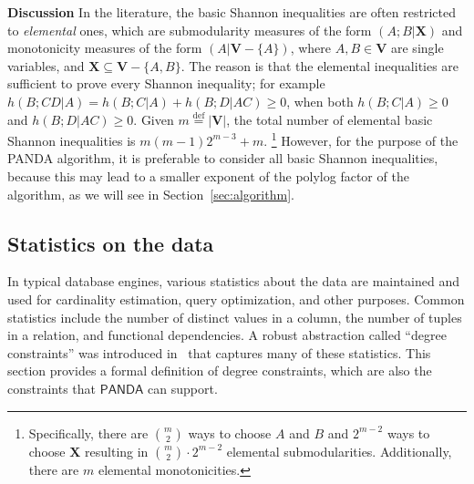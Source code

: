 \documentclass{theoretics}
\newcommand{\set}[1]{\{#1\}}                    %
\newcommand{\defeq}{\stackrel{\text{def}}{=}}
\newcommand{\panda}{\textsf{PANDA}\xspace}
\begin{document}
{\bf Discussion} In the literature, the basic Shannon inequalities are
often restricted to {\em elemental} ones, which are submodularity
measures of the form $(A;B|\bm X)$ and monotonicity measures of the
form $(A|\bm V-\set{A})$, where $A,B \in \bm V$ are single variables,
and $\bm X\subseteq \bm V-\set{A,B}$. The reason is that the elemental
inequalities are sufficient to prove every Shannon inequality; for
example $h(B;CD|A) = h(B;C|A)+h(B;D|AC) \geq 0$, when both
$h(B;C|A)\geq 0$ and $h(B;D|AC)\geq 0$.
Given $m \defeq |\bm V|$, the total number of elemental
basic Shannon inequalities is $m(m-1)2^{m-3}+m$.
\footnote{Specifically, there are
${m \choose 2}$ ways to choose $A$ and $B$ and $2^{m-2}$ ways to choose $\bm X$
resulting in
${m \choose 2}\cdot 2^{m-2}$ elemental submodularities.
Additionally, there are $m$ elemental monotonicities.}
However, for the
purpose of the \panda algorithm, it is preferable to consider all basic
Shannon inequalities, because this may lead to a smaller exponent of
the polylog factor of the algorithm, as we will see in Section~\ref{sec:algorithm}.



\subsection{Statistics on the data}
\label{subsec:degrees}

In typical database engines, various statistics about the data are maintained and used for
cardinality estimation, query optimization, and other purposes. Common statistics include
the number of distinct values in a column, the number of tuples in a relation, and
functional dependencies. A robust abstraction called ``degree constraints'' was introduced
in~\cite{DBLP:conf/pods/Khamis0S17} that captures many of these statistics. This section
provides a formal definition of degree constraints, which are also the constraints that
$\panda$ can support.
\end{document}
